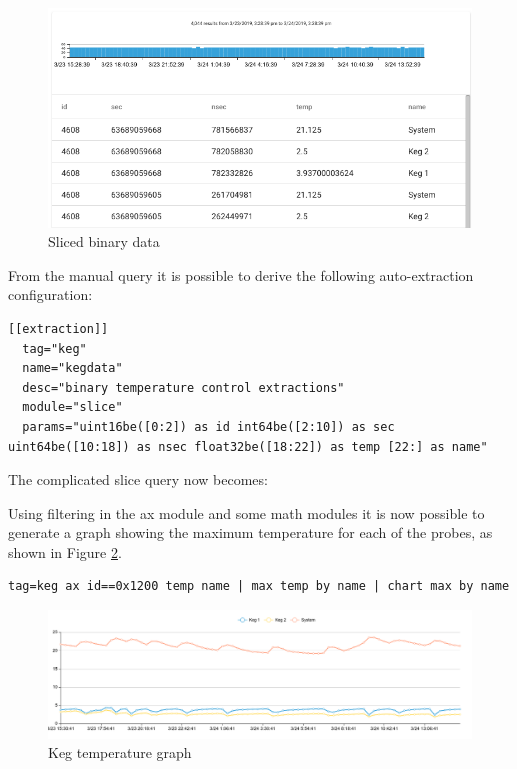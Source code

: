\begin{figure}
	\includegraphics{images/sliced-keg.png}
	\caption{Sliced binary data}
	\label{fig:sliced-keg}
\end{figure}

From the manual query it is possible to derive the following
auto-extraction configuration:

\begin{Verbatim}[breaklines=true]
[[extraction]]
  tag="keg"
  name="kegdata"
  desc="binary temperature control extractions"
  module="slice"
  params="uint16be([0:2]) as id int64be([2:10]) as sec 
uint64be([10:18]) as nsec float32be([18:22]) as temp [22:] as name"
\end{Verbatim}

The complicated slice query now becomes:


Using filtering in the ax module and some math modules it is now
possible to generate a graph showing the maximum temperature for each of
the probes, as shown in Figure \ref{fig:keg-temps}.

\begin{Verbatim}[breaklines=true]
tag=keg ax id==0x1200 temp name | max temp by name | chart max by name
\end{Verbatim}

\begin{figure}
	\includegraphics{images/keg-temps.png}
	\caption{Keg temperature graph}
	\label{fig:keg-temps}
\end{figure}

